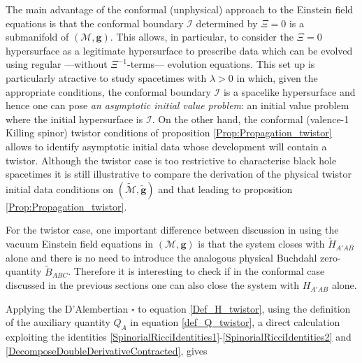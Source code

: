 \documentclass[10pt,a4paper]{article}
\theoremstyle{plain}
\def\bmg{{\bm g}}
\begin{document}
The main advantage of the conformal (unphysical) approach to the
Einstein field equations is that the conformal boundary $\mathscr{I}$
determined by $\Xi=0$ is a submanifold of $(\mathcal{M},\bmg)$. This
allows, in particular, to consider the $\Xi=0$ hypersurface as a
legitimate hypersurface to prescribe data which can be evolved using
regular ---without $\Xi^{-1}$-terms--- evolution equations.  This set up is
particularly atractive to study spacetimes with $\lambda>0$ in which, given the appropriate conditions,
 the conformal boundary $\mathscr{I}$
is a spacelike hypersurface and hence one can pose \emph{an asymptotic
initial value problem}: an initial value problem where the initial
hypersurface is $\mathscr{I}$.
On the other hand, the conformal (valence-1 Killing spinor) twistor conditions
of proposition \eqref{Prop:Propagation_twistor} allows to identify
asymptotic initial data  whose development will
contain a twistor. Although the twistor case is too restrictive to
characterise black hole spacetimes
it is still illustrative to compare the derivation of the physical
twistor initial data conditions on
$(\tilde{\mathcal{M}},\tilde{\bmg})$ and that leading to proposition
\eqref{Prop:Propagation_twistor}.

For the twistor case, one important difference between discussion in
\cite{GasVal15} using the vacuum Einstein field equations in  $(\mathcal{M},\bmg)$
is that the system closes with $\tilde{H}_{A'AB}$ alone and there is no need
to introduce the analogous physical Buchdahl zero-quantity $\tilde{B}_{ABC}$.
Therefore it is interesting to check if in the conformal case discussed
in the previous sections one can also close the system with $H_{A'AB}$ alone.

Applying the D'Alembertian $\square$ to equation
\eqref{Def_H_twistor}, using the definition of the auxiliary quantity
$Q_A$ in equation \eqref{def_Q_twistor}, a direct calculation exploiting the
identities \eqref{SpinorialRicciIdentities1}-\eqref{SpinorialRicciIdentities2}
and \eqref{DecomposeDoubleDerivativeContracted}, gives
\end{document}
